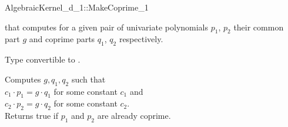 \begin{ccRefConcept}{AlgebraicKernel_d_1::MakeCoprime_1}

\ccDefinition

 that computes for a given pair of 
univariate polynomials $p_1$, $p_2$ their common part $g$ and 
coprime parts $q_1$, $q_2$ respectively.



        { Type convertible to .}
 

{ Computes $g, q_1, q_2$ such that\\
$c_1 \cdot p_1 =  g \cdot q_1$ for some constant $c_1$ and\\
$c_2 \cdot p_2 =  g \cdot q_2$ for some constant $c_2$.\\
Returns true if $p_1$ and $p_2$ are already coprime. 
}

\ccSeeAlso

\end{ccRefConcept}
